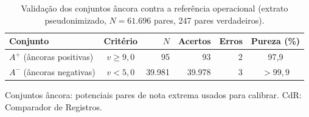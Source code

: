 \begin{table}[!ht]
\centering
\caption{Validação dos conjuntos âncora contra a referência operacional (extrato pseudonimizado, $N = 61.696$ pares, 247 pares verdadeiros).}
\label{tab:cap8-ancoras}
\begin{tabular}{|l|c|r|r|r|c|}
\hline
Conjunto & Critério & $N$ & Acertos & Erros & Pureza (\%) \\
\hline
$A^+$ (âncoras positivas) & $v\geq 9{,}0$ & 95 & 93 & 2 & 97,9 \\
\hline
$A^-$ (âncoras negativas) & $v<5{,}0$ & 39.981 & 39.978 & 3 & $>99{,}9$ \\
\hline
\end{tabular}
\par\footnotesize Conjuntos âncora: potenciais pares de nota extrema usados para calibrar. CdR: Comparador de Registros.
\end{table}
